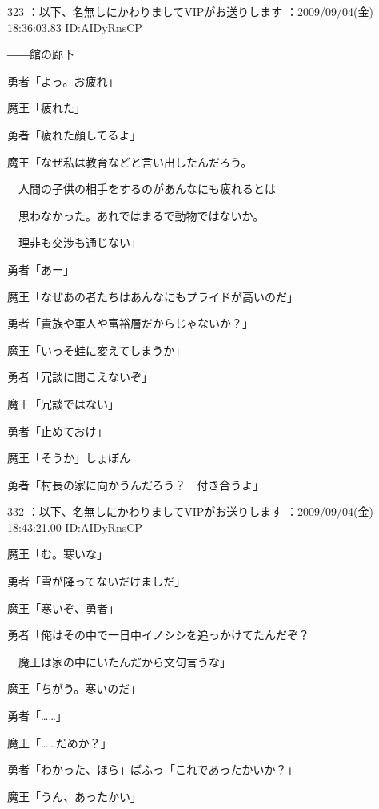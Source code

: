 \documentclass[a4j,twocolumn]{tarticle}
\begin{document}
	
    
    

323 ：以下、名無しにかわりましてVIPがお送りします ：2009/09/04(金) 18:36:03.83 ID:AIDyRnsCP 


――館の廊下 



勇者「よっ。お疲れ」\par{} 
魔王「疲れた」\par{} 
勇者「疲れた顔してるよ」 



魔王「なぜ私は教育などと言い出したんだろう。\par{} 
　人間の子供の相手をするのがあんなにも疲れるとは\par{} 
　思わなかった。あれではまるで動物ではないか。\par{} 
　理非も交渉も通じない」\par{} 
勇者「あー」 



魔王「なぜあの者たちはあんなにもプライドが高いのだ」\par{} 
勇者「貴族や軍人や富裕層だからじゃないか？」 



魔王「いっそ蛙に変えてしまうか」\par{} 
勇者「冗談に聞こえないぞ」\par{} 
魔王「冗談ではない」\par{} 
勇者「止めておけ」 



魔王「そうか」しょぼん\par{} 
勇者「村長の家に向かうんだろう？　付き合うよ」 

	
    
    

332 ：以下、名無しにかわりましてVIPがお送りします ：2009/09/04(金) 18:43:21.00 ID:AIDyRnsCP 


魔王「む。寒いな」\par{} 
勇者「雪が降ってないだけましだ」 



魔王「寒いぞ、勇者」\par{} 
勇者「俺はその中で一日中イノシシを追っかけてたんだぞ？\par{} 
　魔王は家の中にいたんだから文句言うな」 



魔王「ちがう。寒いのだ」\par{} 
勇者「……」 



魔王「……だめか？」\par{} 
勇者「わかった、ほら」ばふっ「これであったかいか？」\par{} 
魔王「うん、あったかい」 
\end{document}
